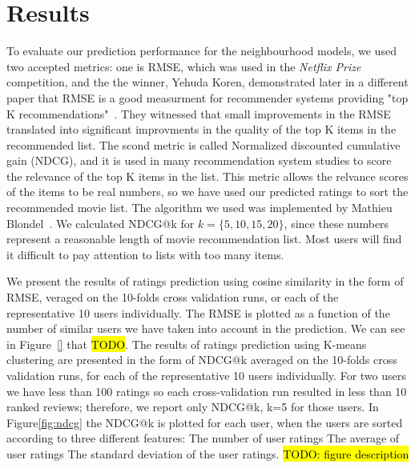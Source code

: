 \section{Results}
\label{sec:results}

To evaluate our prediction performance for the neighbourhood models, we used two accepted metrics: one is RMSE, which was used in the \textit{Netflix Prize} competition, and the the winner, Yehuda Koren, demonstrated later in a different paper that RMSE is a good measurment for recommender systems providing "top K recommendations"~\cite{koren2008factorization}. They witnessed that small improvements in the RMSE translated into significant improvments in the quality of the top K items in the recommended list. The scond metric is called Normalized discounted cumulative gain (NDCG), and it is used in many recommendation system studies to score the relevance of the top K items in the list. This metric allows the relvance scores of the items to be real numbers, so we have used our predicted ratings to sort the recommended movie list. The algorithm we used was implemented by Mathieu Blondel~\cite{letorMetrics}. We calculated NDCG@k for $k=\{5, 10, 15, 20\}$, since these numbers represent a reasonable length of movie recommendation list. Most users will find it difficult to pay attention to lists with too many items. 

We present the results of ratings prediction using cosine similarity in the form of RMSE, veraged on the 10-folds cross validation runs, or each of the representative 10 users individually. The RMSE is plotted as a function of  the number of similar users we have taken into account in the prediction. We can see in Figure~\ref{} that \hl{TODO}.
The results of ratings prediction using K-means clustering are presented in the form of NDCG@k averaged on the 10-folds cross validation runs, for each of the representative 10 users individually. For two users we have less than 100 ratings so each cross-validation run resulted in less than 10 ranked reviews; therefore, we report only NDCG@k, k=5 for those users. In Figure\ref{fig:ndcg} the NDCG@k is plotted for each user, when the users are sorted according to three different features: \blackone The number of user ratings \blacktwo The average of user ratings \blackthree The standard deviation of the user ratings. \hl{TODO: figure description}